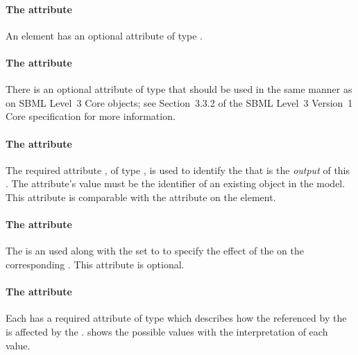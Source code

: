 \paragraph{The  attribute}
An \Output element has an optional  attribute of type . 

\paragraph{The  attribute}
There is an optional  attribute of type  that should be used
in the same manner as on SBML Level~3 Core
objects; see Section~3.3.2 of the SBML Level~3 Version~1 Core
specification for more information.



\paragraph{The  attribute}
The required attribute , of type , is used to identify the \QualitativeSpecies that is the \emph{output} of this \Transition.  The attribute's value must be the identifier of an existing \QualitativeSpecies object in the model.  This attribute is comparable with the  attribute on the  element.

\paragraph{The  attribute}
The  is an  used along with the  set to  to specify the effect of the \Transition on the corresponding \QualitativeSpecies. This attribute is optional. 

\paragraph{The  attribute}
Each \Output has a required attribute  of type  which describes how the \QualitativeSpecies referenced by the \Output is affected by the \Transition.  shows the possible values with the interpretation of each value.

